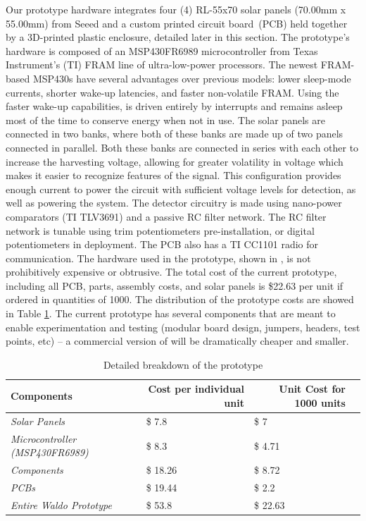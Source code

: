  Our prototype hardware integrates four (4) RL-55x70 solar panels (70.00mm x 55.00mm) from Seeed and a custom printed circuit board~(PCB) held together by a 3D-printed plastic enclosure, detailed later in this section.
The prototype's hardware is composed of an MSP430FR6989 microcontroller from Texas Instrument's (TI) FRAM line of ultra-low-power processors.
The newest FRAM-based MSP430s have several advantages over previous models: lower sleep-mode currents, shorter wake-up latencies, and faster non-volatile FRAM.
Using the faster wake-up capabilities, \sysname is driven entirely by interrupts and remains asleep most of the time to conserve energy when not in use.
The solar panels are connected in two banks, where both of these banks are made up of two panels connected in parallel.
Both these banks are connected in series with each other to increase the harvesting voltage, allowing for greater volatility in voltage which makes it easier to recognize features of the signal.
This configuration provides enough current to power the circuit with sufficient voltage levels for detection, as well as powering the system.
The detector circuitry is made using nano-power comparators (TI TLV3691) and a passive RC filter network. The RC filter network is tunable using trim potentiometers pre-installation, or digital potentiometers in deployment.
The \sysname PCB also has a TI CC1101 radio for communication.
The hardware used in the \sysname prototype, shown in , is not prohibitively expensive or obtrusive.
The total cost of the current prototype, including all PCB, parts, assembly costs, and solar panels is \$22.63 per unit if ordered in quantities of 1000. The distribution of the prototype costs are showed in Table \ref{tab:costbreakdown}.
The current prototype has several components that are meant to enable experimentation and testing (modular board design, jumpers, headers, test points, etc) -- a commercial version of \sysname will be dramatically cheaper and smaller.
\begin{table}[t]
\footnotesize
\caption{Detailed breakdown of the \sysname prototype}
\label{tab:costbreakdown}
\begin{tabular}{@{}p{1.4in}llc@{}}
\toprule
\textbf{Components}          & \multicolumn{1}{r}{\textbf{Cost per individual unit}} & \multicolumn{1}{r}{\textbf{Unit Cost for 1000 units}} \\ \midrule
\textit{Solar Panels}       	& \$ 7.8	&  \$ 7	 \\
\textit{Microcontroller (MSP430FR6989)} & \$ 8.3	& \$ 4.71	\\
\textit{Components} & \$ 18.26	& \$ 8.72     \\ 
\textit{PCBs} & \$ 19.44	& \$ 2.2     \\ \midrule
\textit{Entire Waldo Prototype} & \$ 53.8	& \$ 22.63    \\ \midrule
\end{tabular}
\end{table}

